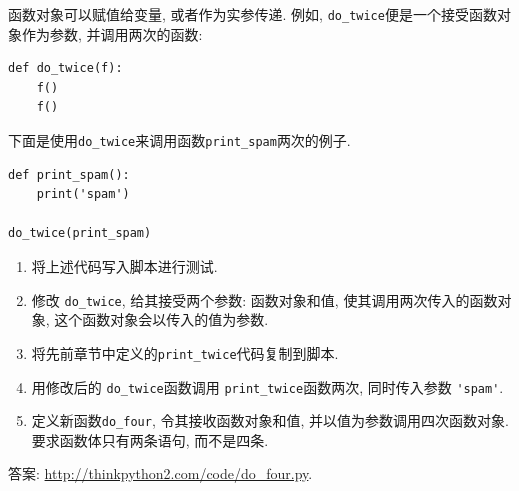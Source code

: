 \documentclass[10pt]{book}
\begin{document}
\begin{exercise}

函数对象可以赋值给变量, 或者作为实参传递. 
例如, \verb"do_twice"便是一个接受函数对象作为参数, 并调用两次的函数:

\begin{verbatim}
def do_twice(f):
    f()
    f()
\end{verbatim}

下面是使用\verb"do_twice"来调用函数\verb"print_spam"两次的例子. 

\begin{verbatim}
def print_spam():
    print('spam')

do_twice(print_spam)
\end{verbatim}

\begin{enumerate}

\item 将上述代码写入脚本进行测试.

\item 修改 \verb"do_twice", 给其接受两个参数: 函数对象和值, 
使其调用两次传入的函数对象, 这个函数对象会以传入的值为参数.

\item 将先前章节中定义的\verb"print_twice"代码复制到脚本.

\item 用修改后的 \verb"do_twice"函数调用 \verb"print_twice"函数两次, 
同时传入参数 \verb"'spam'".

\item 定义新函数\verb"do_four", 令其接收函数对象和值, 
并以值为参数调用四次函数对象. 
要求函数体只有两条语句, 而不是四条. 

\end{enumerate}

答案: \url{http://thinkpython2.com/code/do_four.py}.

\end{exercise}
\end{document}
